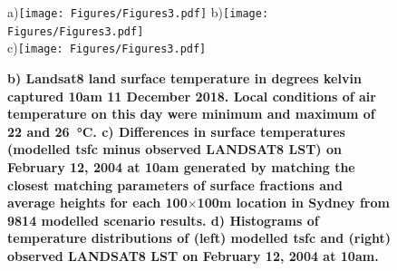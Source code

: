 \documentclass[final,3p,times,authoryear]{elsarticle}
\begin{document}
\begin{figure} 
\centering
a)\texttt{[image: Figures/Figures3.pdf]}
b)\texttt{[image: Figures/Figures3.pdf]}\\
c)\texttt{[image: Figures/Figures3.pdf]}
\caption{\bf b) Landsat8 land surface temperature in degrees kelvin captured 10am 11 December 2018. Local conditions of air temperature on this day were minimum and maximum of 22 and 26\SI{}{\degreeCelsius}. c) Differences in surface temperatures (modelled \gls{tsfc} minus observed LANDSAT8 LST) on February 12, 2004 at 10am generated by matching the closest matching parameters of surface fractions and average heights for each 100$\times$100m location in Sydney from 9814 modelled scenario results. d) Histograms of temperature distributions of (left) modelled \gls{tsfc} and (right) observed LANDSAT8 LST on February 12, 2004 at 10am. }
 \label{fig:Sydney-Landsat-LST-11-03-2019}
 \label{fig:Sydney_TSFC12_85}
\end{figure}




\end{document}
